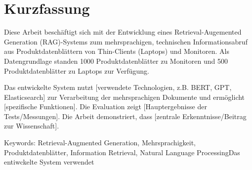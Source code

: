 \cleardoubleoddpage

\chapter*{Kurzfassung}
\thispagestyle{empty} %
Diese Arbeit beschäftigt sich mit der Entwicklung eines Retrieval-Augemented Generation (RAG)-Systems zum mehrsprachigen, technischen Informationsabruf aus Produktdatenblättern von 
Thin-Clients (Laptops) und Monitoren. Als Datengrundlage standen 1000 Produktdatenblätter zu Monitoren und 500 Produktdatenblätter zu Laptops zur Verfügung.

Das entwickelte System nutzt [verwendete Technologien, z.B. BERT, GPT, Elasticsearch] zur Verarbeitung der mehrsprachigen Dokumente und ermöglicht [spezifische Funktionen]. 
Die Evaluation zeigt [Hauptergebnisse der Tests/Messungen]. 
Die Arbeit demonstriert, dass [zentrale Erkenntnisse/Beitrag zur Wissenschaft].

Keywords: Retrieval-Augmented Generation, Mehrsprachigkeit, Produktdatenblätter, Information Retrieval, Natural Language ProcessingDas entiwckelte System verwendet